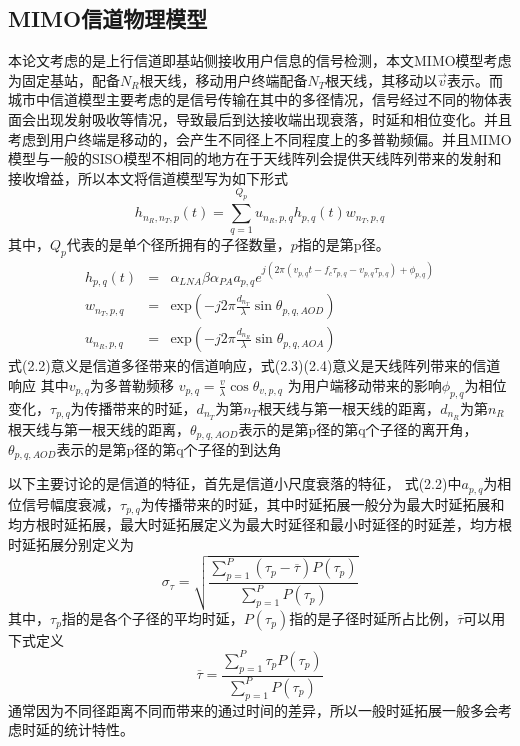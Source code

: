 \documentclass[bachelor,nocolorlinks, printoneside]{seuthesis} %
\begin{document}
\begin{Main}
\section{MIMO信道物理模型}
本论文考虑的是上行信道即基站侧接收用户信息的信号检测，本文MIMO模型考虑为固定基站，配备$N_{R}$根天线，移动用户终端配备$N_{T}$根天线，其移动以$\overrightarrow{v}$表示。而城市中信道模型主要考虑的是信号传输在其中的多径情况，信号经过不同的物体表面会出现发射吸收等情况，导致最后到达接收端出现衰落，时延和相位变化。并且考虑到用户终端是移动的，会产生不同径上不同程度上的多普勒频偏。并且MIMO模型与一般的SISO模型不相同的地方在于天线阵列会提供天线阵列带来的发射和接收增益，所以本文将信道模型写为如下形式
\begin{equation}\label{key}
h_{n_{R},n_{T},p}(t) = \sum_{q=1}^{Q_{p}}u_{n_{R},p,q}h_{p,q}(t)w_{n_{T},p,q}
\end{equation}
其中，$Q_p$代表的是单个径所拥有的子径数量，$p$指的是第p径。
\begin{eqnarray}\label{key}
h_{p,q}(t) &=& \alpha_{LNA}\beta\alpha_{PA}a_{p,q}e^{j(2\pi 
	(v_{p,q}t-f_{c}\tau_{p,q}-v_{p,q}\tau_{p,q})+\phi_{p,q}
	)} \\
w_{n_{T},p,q} &=& \mathrm{exp}(-j2\pi \frac{d_{n_{T}}}{\lambda}\sin \theta_{p,q,AOD})\\
u_{n_{R},p,q} &=& \mathrm{exp}(-j2\pi \frac{d_{n_{R}}}{\lambda}\sin \theta_{p,q,AOA})
\end{eqnarray}
式(2.2)意义是信道多径带来的信道响应，式(2.3)(2.4)意义是天线阵列带来的信道响应
其中$ v_{p,q} $为多普勒频移 $ v_{p,q} = \frac{v}{\lambda}\cos\theta_{v,p,q} $ 为用户端移动带来的影响$ \phi_{p,q} $为相位变化，$\tau_{p,q}$为传播带来的时延，$d_{n_{T}}$为第$n_T$根天线与第一根天线的距离，$d_{n_{R}}$为第$n_R$根天线与第一根天线的距离，$\theta_{p,q,AOD}$表示的是第p径的第q个子径的离开角，$\theta_{p,q,AOD}$表示的是第p径的第q个子径的到达角

以下主要讨论的是信道的特征，首先是信道小尺度衰落的特征，
式(2.2)中$a_{p,q}$为相位信号幅度衰减，$\tau_{p,q}$为传播带来的时延，其中时延拓展一般分为最大时延拓展和均方根时延拓展，最大时延拓展定义为最大时延径和最小时延径的时延差，均方根时延拓展分别定义为
\begin{equation}\label{key}
\sigma_{\tau} = \sqrt{ 
	\frac{
		\sum_{p=1}^{P}(\tau_{p}-\overline{\tau})P(\tau_{p})
	}
	{
		\sum_{p=1}^{P}
		P(\tau_{p})
	}
}
\end{equation}
其中，$\tau_p$指的是各个子径的平均时延，$P(\tau_{p})$指的是子径时延所占比例，$\overline{\tau}$可以用下式定义
\begin{equation}\label{key}
\overline{\tau}=\frac
{\sum^{P}_{p=1}\tau_{p}P(\tau_{p})}
{\sum_{p=1}^{P}P(\tau_{p})}
\end{equation}
通常因为不同径距离不同而带来的通过时间的差异，所以一般时延拓展一般多会考虑时延的统计特性。


\end{Main}
\end{document}
